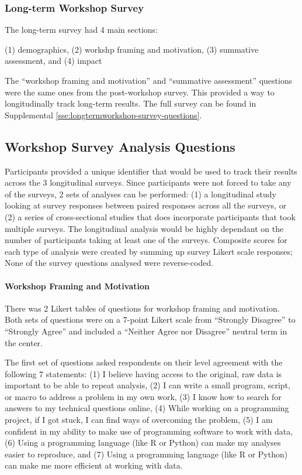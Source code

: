 \documentclass[030-workshop.tex]{subfiles}
\begin{document}
  \subsubsection{Long-term Workshop Survey}

    The long-term survey had 4 main sections:

    (1) demographics,
    (2) workshp framing and motivation,
    (3) summative assessment, and
    (4) impact

    The ``workshop framing and motivation'' and ``summative assessment'' questions were
    the same ones from the post-workshop survey.
    This provided a way to longitudinally track long-term results.
    The full survey can be found in Supplemental \ref{sse:longtermworkshop-survey-questions}.

  \subsection{Workshop Survey Analysis Questions}

    Participants provided a unique identifier that would be used to track their results across the 3 longitudinal surveys.
    Since participants were not forced to take any of the surveys,
    2 sets of analyses can be performed:
    (1) a longitudinal study looking at survey responses between paired responses across all the surveys, or
    (2) a series of cross-sectional studies that does incorporate participants that took multiple surveys.
    The longitudinal analysis would be highly dependant on the number of participants taking at least one of the surveys.
    Composite scores for each type of analysis were created by summing up survey Likert scale responses;
    None of the survey questions analysed were reverse-coded.

      \paragraph{Workshop Framing and Motivation}

          There was 2 Likert tables of questions for workshop framing and motivation.
          Both sets of questions were on a 7-point Likert scale from
          ``Strongly Disagree'' to ``Strongly Agree'' and
          included a ``Neither Agree nor Disagree'' neutral term in the center.

          The first set of questions asked respondents on their level agreement with the following 7 statements:
          (1) I believe having access to the original, raw data is important to be able to repeat analysis,
          (2) I can write a small program, script, or macro to address a problem in my own work,
          (3) I know how to search for answers to my technical questions online,
          (4) While working on a programming project, if I got stuck, I can find ways of overcoming the problem,
          (5) I am confident in my ability to make use of programming software to work with data,
          (6) Using a programming language (like R or Python) can make my analyses easier to reproduce, and
          (7) Using a programming language (like R or Python) can make me more efficient at working with data.
\end{document}
